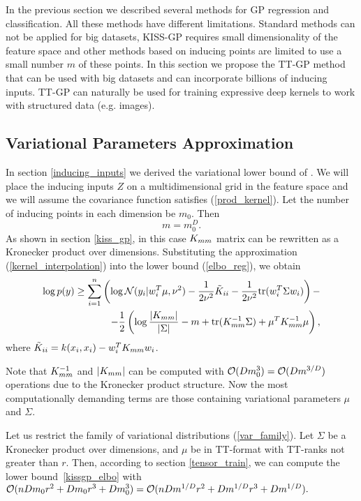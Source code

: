 In the previous section we described several methods for GP regression and
classification. All these methods have different limitations. Standard methods
can not be applied for big datasets, KISS-GP requires small dimensionality of
the feature space and other methods based on inducing points are limited to use
a small number $m$ of these points. In this section we propose the TT-GP method
that can be used with big datasets and can incorporate billions of inducing
inputs. TT-GP can naturally be used for training expressive deep kernels to work
with structured data (e.g. images).

\subsection{Variational Parameters Approximation}
  In section \ref{inducing_inputs} we derived the variational lower bound of
  \citet{hensman2013}. We will place the inducing inputs $Z$ on a
  multidimensional grid in the feature space and we will assume the
  covariance function satisfies (\ref{prod_kernel}). Let the number
  of inducing points in each dimension be $m_0$. Then
  \[
    m = m_0^D.
  \]
  As shown in section \ref{kiss_gp},
  in this case $K_{mm}$ matrix can be rewritten as a Kronecker product over
  dimensions. Substituting the approximation (\ref{kernel_interpolation}) into
  the lower bound (\ref{elbo_reg}), we obtain
  \begin{equation}
  \label{kissgp_elbo}
    \begin{split}
      \log p(y) \ge
      \sum_{i=1}^n \left ( \log \mathcal{N} (y_i | w_i^T \mu, \nu^2) -
        \frac 1 {2\nu^2} \tilde K_{ii} -
        \frac 1 {2\nu^2} \mbox{tr} (w_i^T \Sigma w_i)
      \right )-
      \\
      - \frac 1 2 \left(
        \log \frac {|K_{mm}|} {|\Sigma|} - m + \mbox{tr}(K_{mm}^{-1} \Sigma) +
        \mu^T K_{mm}^{-1} \mu
      \right),
    \end{split}
  \end{equation}
  where $\tilde K_{ii} = k(x_i, x_i) - w_i^T K_{mm} w_i$.

  Note that $K_{mm}^{-1}$ and $|K_{mm}|$ can be computed with
  $\mathcal{O}(D m_0^3) = \mathcal{O}(D m^{3/D})$ operations due to the
  Kronecker product structure. Now the most computationally demanding terms
  are those containing variational parameters $\mu$ and $\Sigma$.

  Let us restrict the family of variational distributions (\ref{var_family}). Let $\Sigma$ be
  a Kronecker product over dimensions, and $\mu$ be in TT-format with TT-ranks
  not greater than $r$. Then, according to section \ref{tensor_train}, we can
  compute the lower bound~\eqref{kissgp_elbo} with
  $\mathcal{O}(nDm_0 r^2 + D m_0 r^3 + Dm_0^3) =
  \mathcal{O}(nD m^{1/D} r^2 + D m^{1/D} r^3 + D m^{1/D}).$

